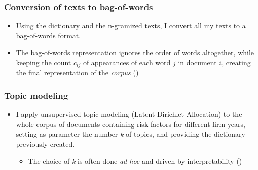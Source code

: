 \documentclass{beamer}
\begin{document}
\begin{frame}
\frametitle{Conversion of texts to bag-of-words}
\begin{itemize}
\item Using the dictionary and the n-gramized texts, I convert all my texts to a bag-of-words format.
\item The bag-of-words representation ignores the order of words altogether, while keeping the count $c_{ij}$ of appearances of each word $j$ in document $i$, creating the final representation of the \textit{corpus} (\cite{Gentzkow2019-va})
\end{itemize}
\end{frame}

\begin{frame}
\frametitle{Topic modeling}
\begin{itemize}
\item I apply unsupervised topic modeling (Latent Dirichlet Allocation) to the whole corpus of documents containing risk factors for different firm-years, setting as parameter the number \textit{k} of topics, and providing the dictionary previously created.
\begin{itemize}
  \item The choice of \textit{k} is often done \textit{ad hoc} and driven by interpretability (\cite{Gentzkow2019-va})
\end{itemize}
\end{itemize}
\end{frame}
\end{document}
